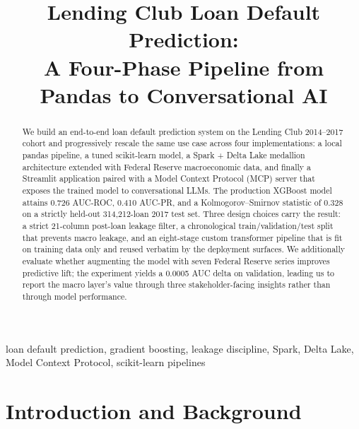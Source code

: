 \documentclass[conference]{IEEEtran}
\begin{document}
\title{Lending Club Loan Default Prediction:\\
A Four-Phase Pipeline from Pandas to Conversational AI}

\author{
}

\maketitle

\begin{abstract}
We build an end-to-end loan default prediction system on the Lending Club
2014--2017 cohort and progressively rescale the same use case across four
implementations: a local pandas pipeline, a tuned scikit-learn model, a
Spark + Delta Lake medallion architecture extended with Federal Reserve
macroeconomic data, and finally a Streamlit application paired with a
Model Context Protocol (MCP) server that exposes the trained model to
conversational LLMs. The production XGBoost model attains 0.726 AUC-ROC,
0.410 AUC-PR, and a Kolmogorov--Smirnov statistic of 0.328 on a strictly
held-out 314{,}212-loan 2017 test set. Three design choices carry the
result: a strict 21-column post-loan leakage filter, a chronological
train/validation/test split that prevents macro leakage, and an eight-stage
custom transformer pipeline that is fit on training data only and reused
verbatim by the deployment surfaces. We additionally evaluate whether
augmenting the model with seven Federal Reserve series improves predictive
lift; the experiment yields a 0.0005 AUC delta on validation, leading us to
report the macro layer's value through three stakeholder-facing insights
rather than through model performance.
\end{abstract}

\begin{IEEEkeywords}
loan default prediction, gradient boosting, leakage discipline, Spark,
Delta Lake, Model Context Protocol, scikit-learn pipelines
\end{IEEEkeywords}

\section{Introduction and Background}
\end{document}
